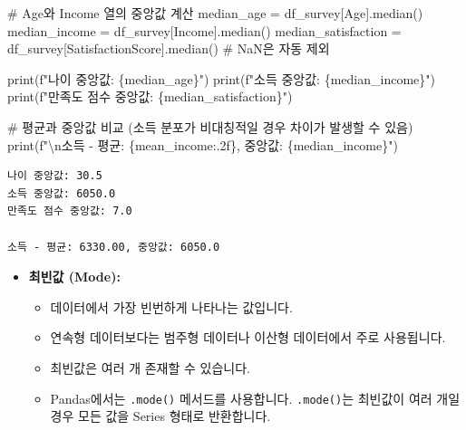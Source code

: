 \documentclass[
  letterpaper,
]{book}
\newenvironment{Shaded}{\begin{snugshade}}{\end{snugshade}}
\newcommand{\BuiltInTok}[1]{\textcolor[rgb]{0.00,0.23,0.31}{#1}}
\newcommand{\CharTok}[1]{\textcolor[rgb]{0.13,0.47,0.30}{#1}}
\newcommand{\CommentTok}[1]{\textcolor[rgb]{0.37,0.37,0.37}{#1}}
\newcommand{\NormalTok}[1]{\textcolor[rgb]{0.00,0.23,0.31}{#1}}
\newcommand{\OperatorTok}[1]{\textcolor[rgb]{0.37,0.37,0.37}{#1}}
\newcommand{\SpecialCharTok}[1]{\textcolor[rgb]{0.37,0.37,0.37}{#1}}
\newcommand{\SpecialStringTok}[1]{\textcolor[rgb]{0.13,0.47,0.30}{#1}}
\newcommand{\StringTok}[1]{\textcolor[rgb]{0.13,0.47,0.30}{#1}}
\providecommand{\tightlist}{%
  \setlength{\itemsep}{0pt}\setlength{\parskip}{0pt}}
\begin{document}
\begin{Shaded}
\begin{Highlighting}[]
    \CommentTok{\# Age와 Income 열의 중앙값 계산}
\NormalTok{    median\_age }\OperatorTok{=}\NormalTok{ df\_survey[}\StringTok{\textquotesingle{}Age\textquotesingle{}}\NormalTok{].median()}
\NormalTok{    median\_income }\OperatorTok{=}\NormalTok{ df\_survey[}\StringTok{\textquotesingle{}Income\textquotesingle{}}\NormalTok{].median()}
\NormalTok{    median\_satisfaction }\OperatorTok{=}\NormalTok{ df\_survey[}\StringTok{\textquotesingle{}SatisfactionScore\textquotesingle{}}\NormalTok{].median() }\CommentTok{\# NaN은 자동 제외}

    \BuiltInTok{print}\NormalTok{(}\SpecialStringTok{f"나이 중앙값: }\SpecialCharTok{\{}\NormalTok{median\_age}\SpecialCharTok{\}}\SpecialStringTok{"}\NormalTok{)}
    \BuiltInTok{print}\NormalTok{(}\SpecialStringTok{f"소득 중앙값: }\SpecialCharTok{\{}\NormalTok{median\_income}\SpecialCharTok{\}}\SpecialStringTok{"}\NormalTok{)}
    \BuiltInTok{print}\NormalTok{(}\SpecialStringTok{f"만족도 점수 중앙값: }\SpecialCharTok{\{}\NormalTok{median\_satisfaction}\SpecialCharTok{\}}\SpecialStringTok{"}\NormalTok{)}

    \CommentTok{\# 평균과 중앙값 비교 (소득 분포가 비대칭적일 경우 차이가 발생할 수 있음)}
    \BuiltInTok{print}\NormalTok{(}\SpecialStringTok{f"}\CharTok{\textbackslash{}n}\SpecialStringTok{소득 {-} 평균: }\SpecialCharTok{\{}\NormalTok{mean\_income}\SpecialCharTok{:.2f\}}\SpecialStringTok{, 중앙값: }\SpecialCharTok{\{}\NormalTok{median\_income}\SpecialCharTok{\}}\SpecialStringTok{"}\NormalTok{)}
\end{Highlighting}
\end{Shaded}

\begin{verbatim}
나이 중앙값: 30.5
소득 중앙값: 6050.0
만족도 점수 중앙값: 7.0

소득 - 평균: 6330.00, 중앙값: 6050.0
\end{verbatim}

\begin{itemize}
\tightlist
\item
  \textbf{최빈값 (Mode):}

  \begin{itemize}
  \tightlist
  \item
    데이터에서 가장 빈번하게 나타나는 값입니다.
  \item
    연속형 데이터보다는 범주형 데이터나 이산형 데이터에서 주로
    사용됩니다.
  \item
    최빈값은 여러 개 존재할 수 있습니다.
  \item
    Pandas에서는 \texttt{.mode()} 메서드를 사용합니다.
    \texttt{.mode()}는 최빈값이 여러 개일 경우 모든 값을 Series 형태로
    반환합니다.
  \end{itemize}
\end{itemize}
\end{document}
